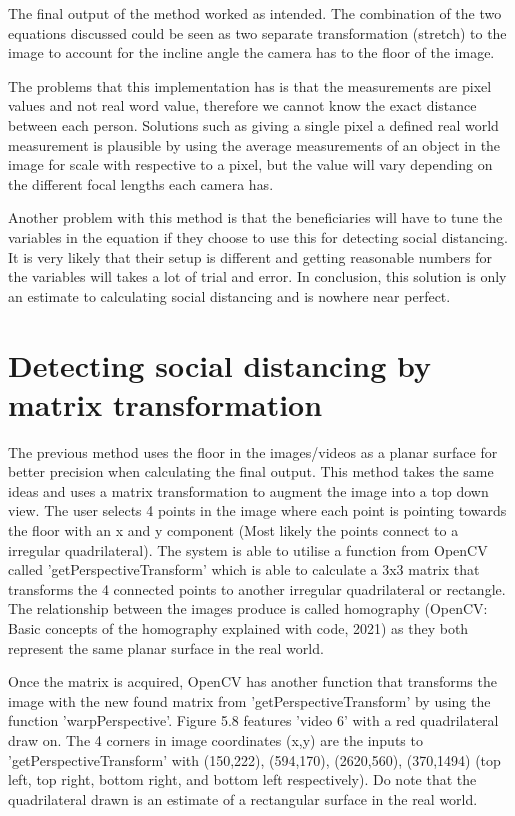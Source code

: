 \documentclass[12pt]{report}
\begin{document}
The final output of the method worked as intended. The combination of the two equations discussed could be seen as two separate transformation (stretch) to the image to account for the incline angle the camera has to the floor of the image.
\vspace{2mm}

The problems that this implementation has is that the measurements are pixel values and not real word value, therefore we cannot know the exact distance between each person. Solutions such as giving a single pixel a defined real world measurement is plausible by using the average measurements of an object in the image for scale with respective to a pixel, but the value will vary depending on the different focal lengths each camera has.

\vspace{2mm}

Another problem with this method is that the beneficiaries will have to tune the variables in the equation if they choose to use this for detecting social distancing. It is very likely that their setup is different and getting reasonable numbers for the variables will takes a lot of trial and error. 
In conclusion, this solution is only an estimate to calculating social distancing and is nowhere near perfect. 

\section{Detecting social distancing by matrix transformation}

The previous method uses the floor in the images/videos as a planar surface for better precision when calculating the final output. This method takes the same ideas and uses a matrix transformation to augment the image into a top down view. The user selects 4 points in the image where each point is pointing towards the floor with an x and y component (Most likely the points connect to a irregular quadrilateral). The system is able to utilise a function from OpenCV called 'getPerspectiveTransform' which is able to calculate a 3x3 matrix that transforms the 4 connected points to another irregular quadrilateral or rectangle. The relationship between the images produce is called homography (OpenCV: Basic concepts of the homography explained with code, 2021) as they both represent the same planar surface in the real world.

\vspace{2mm}

Once the matrix is acquired, OpenCV has another function that transforms the image with the new found matrix from 'getPerspectiveTransform' by using the function 'warpPerspective'. Figure 5.8 features 'video 6' with a red quadrilateral draw on. The 4 corners in image coordinates (x,y) are the inputs to 'getPerspectiveTransform' with (150,222), (594,170), (2620,560), (370,1494) (top left, top right, bottom right, and bottom left respectively). Do note that the quadrilateral drawn is an estimate of a rectangular surface in the real world.
\end{document}
